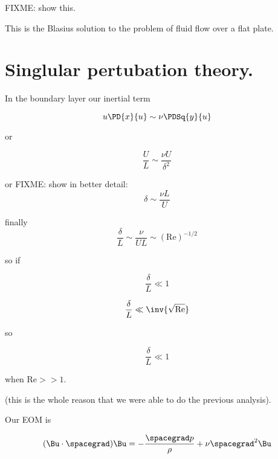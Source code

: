 FIXME: show this.

This is the Blasius solution to the problem of fluid flow over a flat plate.

\section{Singlular pertubation theory.}

In the boundary layer our inertial term

\begin{equation}\label{eqn:continuumL19:410}
u \PD{x}{u} \sim \nu \PDSq{y}{u}
\end{equation}

or

\begin{equation}\label{eqn:continuumL19:430}
\frac{U}{L} \sim \frac{\nu U}{\delta^2}
\end{equation}

or
FIXME: show in better detail:
\begin{equation}\label{eqn:continuumL19:450}
\delta  \sim \frac{\nu L}{U}
\end{equation}

finally
\begin{equation}\label{eqn:continuumL19:470}
\frac{\delta}{L} \sim \frac{\nu}{U L} \sim (\text{Re})^{-1/2}
\end{equation}

so if

\begin{equation}\label{eqn:continuumL19:490}
\frac{\delta}{L} \ll 1
\end{equation}

\begin{equation}\label{eqn:continuumL19:510}
\frac{\delta}{L} \ll \inv{\sqrt{\text{Re}}}
\end{equation}

so 

\begin{equation}\label{eqn:continuumL19:530}
\frac{\delta}{L} \ll 1
\end{equation}

when $\text{Re} >> 1$.

(this is the whole reason that we were able to do the previous analysis).

Our EOM is

\begin{equation}\label{eqn:continuumL19:550}
(\Bu \cdot \spacegrad) \Bu = -\frac{\spacegrad p}{\rho } + \nu \spacegrad^2 \Bu
\end{equation}

